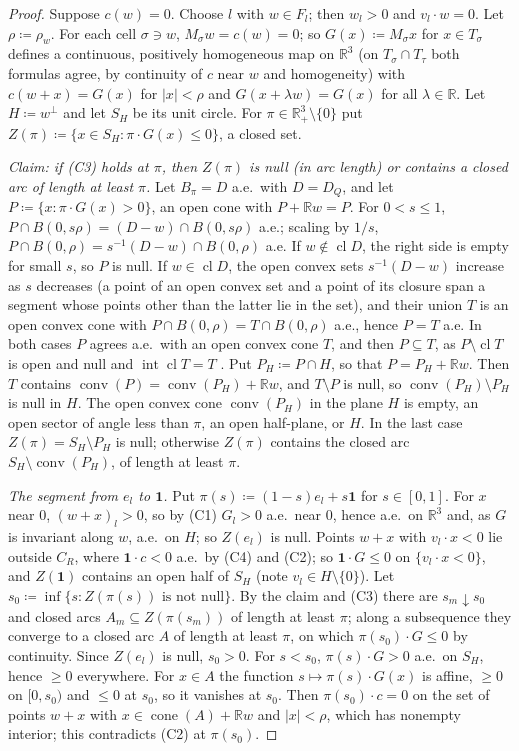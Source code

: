 \documentclass[11pt]{article}
\newcommand{\R}{\mathbb{R}}
\newcommand{\one}{\mathbf{1}}
\DeclareMathOperator{\conv}{conv}
\DeclareMathOperator{\cone}{cone}
\DeclareMathOperator{\cl}{cl}
\DeclareMathOperator{\inter}{int}
\theoremstyle{plain}
\theoremstyle{definition}
\theoremstyle{remark}
\begin{document}
\begin{proof}
Suppose $c(w)=0$. Choose $l$ with $w\in F_l$; then $w_l>0$ and $v_l\cdot w=0$. Let
$\rho\coloneqq\rho_w$. For each cell $\sigma\ni w$, $M_\sigma w=c(w)=0$; so $G(x)\coloneqq
M_\sigma x$ for $x\in T_\sigma$ defines a continuous, positively homogeneous map on $\R^3$
(on $T_\sigma\cap T_\tau$ both formulas agree, by continuity of $c$ near $w$ and
homogeneity) with $c(w+x)=G(x)$ for $|x|<\rho$ and $G(x+\lambda w)=G(x)$ for all
$\lambda\in\R$. Let $H\coloneqq w^\perp$ and let $S_H$ be its unit circle. For $\pi\in
\R^3_+\setminus\{0\}$ put $Z(\pi)\coloneqq\{x\in S_H:\pi\cdot G(x)\le0\}$, a closed set.

\emph{Claim: if (C3) holds at $\pi$, then $Z(\pi)$ is null (in arc length) or contains a
closed arc of length at least $\pi$.} Let $B_\pi=D$ a.e.\ with $D=D_Q$, and let $P\coloneqq
\{x:\pi\cdot G(x)>0\}$, an open cone with $P+\R w=P$. For $0<s\le1$, $P\cap B(0,s\rho)=
(D-w)\cap B(0,s\rho)$ a.e.; scaling by $1/s$, $P\cap B(0,\rho)=s^{-1}(D-w)\cap B(0,\rho)$
a.e. If $w\notin\cl D$, the right side is empty for small $s$, so $P$ is null. If $w\in
\cl D$, the open convex sets $s^{-1}(D-w)$ increase as $s$ decreases (a point of an open
convex set and a point of its closure span a segment whose points other than the latter
lie in the set), and their union $T$ is an open convex cone with $P\cap B(0,\rho)=T\cap
B(0,\rho)$ a.e., hence $P=T$ a.e. In both cases $P$ agrees a.e.\ with an open convex cone
$T$, and then $P\subseteq T$, as $P\setminus\cl T$ is open and null and $\inter\cl T=T$
\cite[Thm.~6.3]{Rockafellar}. Put $P_H\coloneqq P\cap H$, so that $P=P_H+\R w$. Then $T$
contains $\conv(P)=\conv(P_H)+\R w$, and $T\setminus P$ is null, so $\conv(P_H)\setminus P_H$
is null in $H$. The open convex cone $\conv(P_H)$ in the plane $H$ is empty, an open sector
of angle less than $\pi$, an open half-plane, or $H$. In the last case $Z(\pi)=S_H\setminus
P_H$ is null; otherwise $Z(\pi)$ contains the closed arc $S_H\setminus\conv(P_H)$, of length
at least $\pi$.

\emph{The segment from $e_l$ to $\one$.} Put $\pi(s)\coloneqq(1-s)e_l+s\one$ for $s\in[0,1]$.
For $x$ near $0$, $(w+x)_l>0$, so by (C1) $G_l>0$ a.e.\ near $0$, hence a.e.\ on $\R^3$ and,
as $G$ is invariant along $w$, a.e.\ on $H$; so $Z(e_l)$ is null. Points $w+x$ with
$v_l\cdot x<0$ lie outside $C_R$, where $\one\cdot c<0$ a.e.\ by (C4) and (C2); so $\one\cdot
G\le0$ on $\{v_l\cdot x<0\}$, and $Z(\one)$ contains an open half of $S_H$ (note $v_l\in H
\setminus\{0\}$). Let $s_0\coloneqq\inf\{s:Z(\pi(s))\text{ is not null}\}$. By the claim and (C3)
there are $s_m\downarrow s_0$ and closed arcs $A_m\subseteq Z(\pi(s_m))$ of length at least
$\pi$; along a subsequence they converge to a closed arc $A$ of length at least $\pi$, on
which $\pi(s_0)\cdot G\le0$ by continuity. Since $Z(e_l)$ is null, $s_0>0$. For $s<s_0$,
$\pi(s)\cdot G>0$ a.e.\ on $S_H$, hence $\ge0$ everywhere. For $x\in A$ the function
$s\mapsto\pi(s)\cdot G(x)$ is affine, $\ge0$ on $[0,s_0)$ and $\le0$ at $s_0$, so it vanishes
at $s_0$. Then $\pi(s_0)\cdot c=0$ on the set of points $w+x$ with $x\in\cone(A)+\R w$ and
$|x|<\rho$, which has nonempty interior; this contradicts (C2) at $\pi(s_0)$.
\end{proof}
\end{document}
